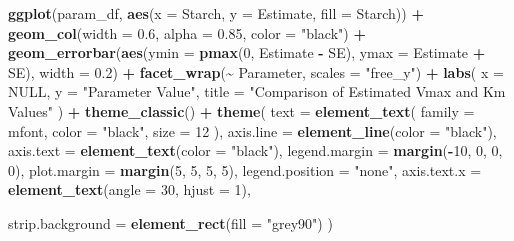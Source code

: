 \documentclass[
  12pt,
]{article}
\newenvironment{Shaded}{\begin{snugshade}}{\end{snugshade}}
\newcommand{\AttributeTok}[1]{\textcolor[rgb]{0.13,0.29,0.53}{#1}}
\newcommand{\ConstantTok}[1]{\textcolor[rgb]{0.56,0.35,0.01}{#1}}
\newcommand{\DecValTok}[1]{\textcolor[rgb]{0.00,0.00,0.81}{#1}}
\newcommand{\FloatTok}[1]{\textcolor[rgb]{0.00,0.00,0.81}{#1}}
\newcommand{\FunctionTok}[1]{\textcolor[rgb]{0.13,0.29,0.53}{\textbf{#1}}}
\newcommand{\NormalTok}[1]{#1}
\newcommand{\SpecialCharTok}[1]{\textcolor[rgb]{0.81,0.36,0.00}{\textbf{#1}}}
\newcommand{\StringTok}[1]{\textcolor[rgb]{0.31,0.60,0.02}{#1}}
\newcounter{none} %
\begin{document}
\begin{Shaded}
\begin{Highlighting}[]
\FunctionTok{ggplot}\NormalTok{(param\_df, }\FunctionTok{aes}\NormalTok{(}\AttributeTok{x =}\NormalTok{ Starch, }\AttributeTok{y =}\NormalTok{ Estimate, }\AttributeTok{fill =}\NormalTok{ Starch)) }\SpecialCharTok{+}
  \FunctionTok{geom\_col}\NormalTok{(}\AttributeTok{width =} \FloatTok{0.6}\NormalTok{, }\AttributeTok{alpha =} \FloatTok{0.85}\NormalTok{, }\AttributeTok{color =} \StringTok{"black"}\NormalTok{) }\SpecialCharTok{+}
  \FunctionTok{geom\_errorbar}\NormalTok{(}\FunctionTok{aes}\NormalTok{(}\AttributeTok{ymin =} \FunctionTok{pmax}\NormalTok{(}\DecValTok{0}\NormalTok{, Estimate }\SpecialCharTok{{-}}\NormalTok{ SE), }\AttributeTok{ymax =}\NormalTok{ Estimate }\SpecialCharTok{+}\NormalTok{ SE), }
                \AttributeTok{width =} \FloatTok{0.2}\NormalTok{) }\SpecialCharTok{+}
  \FunctionTok{facet\_wrap}\NormalTok{(}\SpecialCharTok{\textasciitilde{}}\NormalTok{ Parameter, }\AttributeTok{scales =} \StringTok{"free\_y"}\NormalTok{) }\SpecialCharTok{+}
  \FunctionTok{labs}\NormalTok{(}
    \AttributeTok{x =} \ConstantTok{NULL}\NormalTok{,}
    \AttributeTok{y =} \StringTok{"Parameter Value"}\NormalTok{,}
    \AttributeTok{title =} \StringTok{"Comparison of Estimated Vmax and Km Values"}
\NormalTok{  ) }\SpecialCharTok{+}
  \FunctionTok{theme\_classic}\NormalTok{() }\SpecialCharTok{+}
  \FunctionTok{theme}\NormalTok{(}
    \AttributeTok{text =} \FunctionTok{element\_text}\NormalTok{(}
      \AttributeTok{family =}\NormalTok{ mfont,}
      \AttributeTok{color =} \StringTok{"black"}\NormalTok{,}
      \AttributeTok{size =} \DecValTok{12}
\NormalTok{    ),}
    \AttributeTok{axis.line =} \FunctionTok{element\_line}\NormalTok{(}\AttributeTok{color =} \StringTok{"black"}\NormalTok{),}
    \AttributeTok{axis.text =} \FunctionTok{element\_text}\NormalTok{(}\AttributeTok{color =} \StringTok{"black"}\NormalTok{),}
    \AttributeTok{legend.margin =} \FunctionTok{margin}\NormalTok{(}\SpecialCharTok{{-}}\DecValTok{10}\NormalTok{, }\DecValTok{0}\NormalTok{, }\DecValTok{0}\NormalTok{, }\DecValTok{0}\NormalTok{),}
    \AttributeTok{plot.margin =} \FunctionTok{margin}\NormalTok{(}\DecValTok{5}\NormalTok{, }\DecValTok{5}\NormalTok{, }\DecValTok{5}\NormalTok{, }\DecValTok{5}\NormalTok{),}
    \AttributeTok{legend.position =} \StringTok{"none"}\NormalTok{,}
    \AttributeTok{axis.text.x =} \FunctionTok{element\_text}\NormalTok{(}\AttributeTok{angle =} \DecValTok{30}\NormalTok{, }\AttributeTok{hjust =} \DecValTok{1}\NormalTok{),}
    
    \AttributeTok{strip.background =} \FunctionTok{element\_rect}\NormalTok{(}\AttributeTok{fill =} \StringTok{"grey90"}\NormalTok{)}
\NormalTok{  )}
\end{Highlighting}
\end{Shaded}
\end{document}
